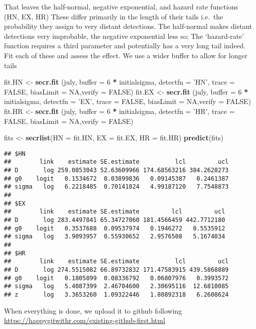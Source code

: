 \documentclass[]{article}
\newenvironment{Shaded}{\begin{snugshade}}{\end{snugshade}}
\newcommand{\DataTypeTok}[1]{\textcolor[rgb]{0.13,0.29,0.53}{#1}}
\newcommand{\DecValTok}[1]{\textcolor[rgb]{0.00,0.00,0.81}{#1}}
\newcommand{\KeywordTok}[1]{\textcolor[rgb]{0.13,0.29,0.53}{\textbf{#1}}}
\newcommand{\NormalTok}[1]{#1}
\newcommand{\OperatorTok}[1]{\textcolor[rgb]{0.81,0.36,0.00}{\textbf{#1}}}
\newcommand{\OtherTok}[1]{\textcolor[rgb]{0.56,0.35,0.01}{#1}}
\newcommand{\StringTok}[1]{\textcolor[rgb]{0.31,0.60,0.02}{#1}}
\begin{document}
That leaves the half-normal, negative exponential, and hazard rate
functions (HN, EX, HR) These differ primarily in the length of their
tails i.e.~the probability they assign to very distant detections. The
half-normal makes distant detections very improbable, the negative
exponential less so; The `hazard-rate' function requires a third
parameter and potentially has a very long tail indeed. Fit each of these
and assess the effect. We use a wider buffer to allow for longer tails

\begin{Shaded}
\begin{Highlighting}[]
\NormalTok{fit.HN <-}\StringTok{ }\KeywordTok{secr.fit}\NormalTok{ (july, }\DataTypeTok{buffer =} \DecValTok{6} \OperatorTok{*}\StringTok{ }\NormalTok{initialsigma, }\DataTypeTok{detectfn =} \StringTok{'HN'}\NormalTok{, }\DataTypeTok{trace =} \OtherTok{FALSE}\NormalTok{, }\DataTypeTok{biasLimit =} \OtherTok{NA}\NormalTok{,}\DataTypeTok{verify =} \OtherTok{FALSE}\NormalTok{)}
\NormalTok{fit.EX <-}\StringTok{ }\KeywordTok{secr.fit}\NormalTok{ (july, }\DataTypeTok{buffer =} \DecValTok{6} \OperatorTok{*}\StringTok{ }\NormalTok{initialsigma, }\DataTypeTok{detectfn =} \StringTok{'EX'}\NormalTok{, }\DataTypeTok{trace =} \OtherTok{FALSE}\NormalTok{, }\DataTypeTok{biasLimit =} \OtherTok{NA}\NormalTok{,}\DataTypeTok{verify =} \OtherTok{FALSE}\NormalTok{)}
\NormalTok{fit.HR <-}\StringTok{ }\KeywordTok{secr.fit}\NormalTok{ (july, }\DataTypeTok{buffer =} \DecValTok{6} \OperatorTok{*}\StringTok{ }\NormalTok{initialsigma, }\DataTypeTok{detectfn =} \StringTok{'HR'}\NormalTok{, }\DataTypeTok{trace =} \OtherTok{FALSE}\NormalTok{, }\DataTypeTok{biasLimit =} \OtherTok{NA}\NormalTok{,}\DataTypeTok{verify =} \OtherTok{FALSE}\NormalTok{)}

\NormalTok{fits <-}\StringTok{ }\KeywordTok{secrlist}\NormalTok{(}\DataTypeTok{HN =}\NormalTok{ fit.HN, }\DataTypeTok{EX =}\NormalTok{ fit.EX, }\DataTypeTok{HR =}\NormalTok{ fit.HR)}
\KeywordTok{predict}\NormalTok{(fits)}
\end{Highlighting}
\end{Shaded}

\begin{verbatim}
## $HN
##        link    estimate SE.estimate          lcl         ucl
## D       log 259.0853043 52.63609966 174.68563216 384.2628273
## g0    logit   0.1534672  0.03899836   0.09145387   0.2461387
## sigma   log   6.2218485  0.70141024   4.99187120   7.7548873
## 
## $EX
##        link    estimate SE.estimate         lcl         ucl
## D       log 283.4497841 65.34727060 181.4566459 442.7712180
## g0    logit   0.3537688  0.09537974   0.1946272   0.5535912
## sigma   log   3.9093957  0.55930652   2.9576508   5.1674034
## 
## $HR
##        link    estimate SE.estimate          lcl         ucl
## D       log 274.5515082 66.89732832 171.47583915 439.5868889
## g0    logit   0.1805899  0.08336792   0.06807976   0.3993572
## sigma   log   5.4087399  2.46704600   2.30695116  12.6810085
## z       log   3.3653260  1.09322446   1.80892318   6.2608624
\end{verbatim}

When everything is done, we upload it to github following
\url{https://happygitwithr.com/existing-github-first.html}
\end{document}
